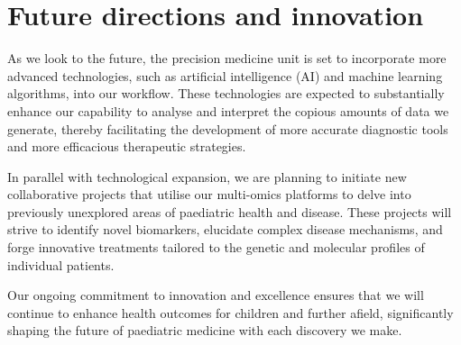 \section{Future directions and innovation}

As we look to the future, the precision medicine unit is set to incorporate more advanced technologies, such as artificial intelligence (AI) and machine learning algorithms, into our workflow. These technologies are expected to substantially enhance our capability to analyse and interpret the copious amounts of data we generate, thereby facilitating the development of more accurate diagnostic tools and more efficacious therapeutic strategies.

In parallel with technological expansion, we are planning to initiate new collaborative projects that utilise our multi-omics platforms to delve into previously unexplored areas of paediatric health and disease. These projects will strive to identify novel biomarkers, elucidate complex disease mechanisms, and forge innovative treatments tailored to the genetic and molecular profiles of individual patients.

Our ongoing commitment to innovation and excellence ensures that we will continue to enhance health outcomes for children and further afield, significantly shaping the future of paediatric medicine with each discovery we make.
